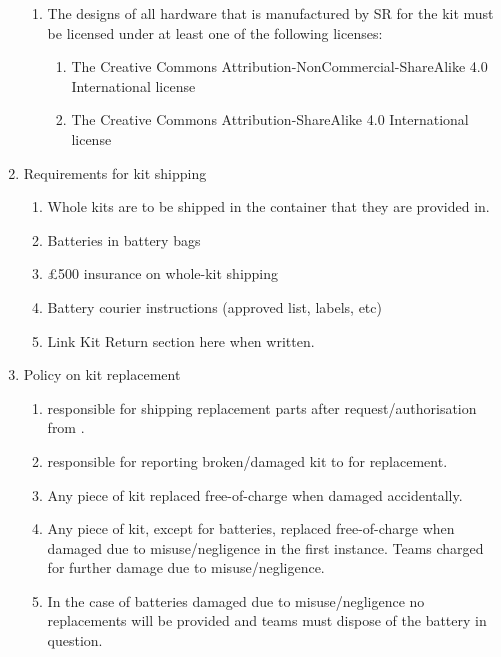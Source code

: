\begin{enumerate}
\begin{enumerate}
  \item The designs of all hardware that is manufactured by SR for the kit must be licensed under at least one of the following licenses:
    \begin{enumerate}
    \item The Creative Commons Attribution-NonCommercial-ShareAlike 4.0 International license
    \item The Creative Commons Attribution-ShareAlike 4.0 International license
    \end{enumerate}
  \end{enumerate}


\item Requirements for kit shipping
  \begin{enumerate}
    \item{Whole kits are to be shipped in the container that they are provided in.}
    \item{Batteries in battery bags}
    \item{\pounds500 insurance on whole-kit shipping}
    \item{Battery courier instructions (approved list, labels, etc)}
    \item{Link Kit Return section here when written.}
  \end{enumerate}
\item Policy on kit replacement
  \begin{enumerate}
    \item{ responsible for shipping replacement parts after request/authorisation from .}
    \item{ responsible for reporting broken/damaged kit to  for replacement.}
    \item{Any piece of kit replaced free-of-charge when damaged accidentally.}
    \item{Any piece of kit, except for batteries, replaced free-of-charge when damaged due to misuse/negligence in the first instance. Teams charged for further damage due to misuse/negligence.}
    \item{In the case of batteries damaged due to misuse/negligence no replacements will be provided and teams must dispose of the battery in question.}
  \end{enumerate}


\end{enumerate}
